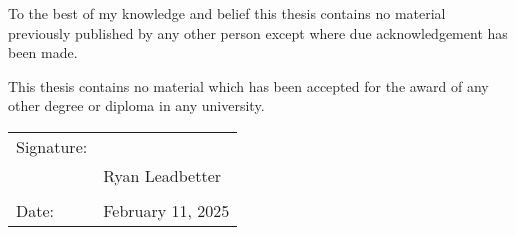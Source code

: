 \vspace*{2cm}

\noindent
{}

\vfill
\vspace{3\baselineskip}

\noindent
To the best of my knowledge and belief this thesis contains no material previously published by any other person except where due acknowledgement has been made.

\vspace{14pt}

\noindent
This thesis contains no material which has been accepted for the award of any other degree or diploma in any university.

\vfill
\vspace{5cm}

\noindent
\begin{tabular}{@{}ll}
    Signature: & \hrulefill                \\
               & Ryan Leadbetter \hspace{5em} \\
               &                           \\
    Date:      & February 11, 2025             \\
\end{tabular}

\vspace*{3.5cm}

\clearpage
